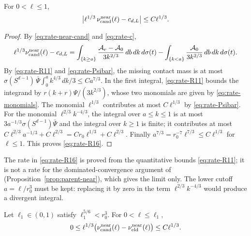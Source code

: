 \begin{lemma}\label{lem:rate-nearcand}
For $0<\ell\le1$,
\begin{equation}\label{eq:rate-R16}
\bigl|\ell^{1/3}\,\nu^{\rm near}_{\mathrm{cand}}(\ell)-c_{d,L}\bigr|\le C\ell^{1/3}.
\end{equation}
\end{lemma}

\begin{proof}
By \eqref{eq:rate-near-cand} and \eqref{eq:rate-c},
\[
\ell^{1/3}\nu^{\rm near}_{\mathrm{cand}}(\ell)-c_{d,L}=\int_{\{k\ge a\}}\frac{\mathcal A_r-\mathcal A_0}{3k^{2/3}}\,db\,dk\,d\sigma(t)-\int_{\{k<a\}}\frac{\mathcal A_0}{3k^{2/3}}\,db\,dk\,d\sigma(t).
\]
By \eqref{eq:rate-R11} and \eqref{eq:rate-Psibar}, the missing contact mass is at most $\sigma(S^{d-1})\,\bar\Psi\int_0^ak^{4/3}\,dk/3\le Ca^{7/3}$. In the first integral, \eqref{eq:rate-R11} bounds the integrand by $r(k+r)\Psi/(3k^{2/3})$, whose two monomials are given by \eqref{eq:rate-monomials}. The monomial $\ell^{1/3}$ contributes at most $C\ell^{1/3}$ by \eqref{eq:rate-Psibar}. For the monomial $\ell^{2/3}k^{-4/3}$, the integral over $a\le k\le1$ is at most $3a^{-1/3}\sigma(S^{d-1})\bar\Psi$ and the integral over $k\ge1$ is finite; it contributes at most $C\ell^{2/3}a^{-1/3}+C\ell^{2/3}=Cr_0\ell^{1/3}+C\ell^{2/3}$. Finally $a^{7/3}=r_0^{-7}\ell^{7/3}\le C\ell^{1/3}$ for $\ell\le1$. This proves \eqref{eq:rate-R16}.
\end{proof}

The rate in \eqref{eq:rate-R16} is proved from the quantitative bounds \eqref{eq:rate-R11}; it is not a rate for the dominated-convergence argument of \cite[\S13]{parentP} (Proposition~\ref{prop:parent-near}), which gives the limit only. The lower cutoff $a=\ell/r_0^3$ must be kept: replacing it by zero in the term $\ell^{2/3}k^{-4/3}$ would produce a divergent integral.

\begin{lemma}\label{lem:rate-loss}
Let $\ell_1\in(0,1)$ satisfy $\ell_1^{5/6}<r_0^3$. For $0<\ell\le\ell_1$,
\begin{equation}\label{eq:rate-R18}
0\le\ell^{1/3}\bigl(\nu^{\rm near}_{\mathrm{cand}}(\ell)-\nu^{\rm near}_{\mathrm{eld}}(\ell)\bigr)\le C\ell^{1/3}.
\end{equation}
\end{lemma}


